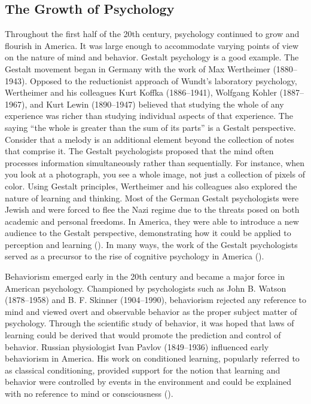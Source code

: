 \documentclass[
]{krantz}
\begin{document}
\subsection*{The Growth of Psychology}\label{the-growth-of-psychology}


Throughout the first half of the 20th century, psychology continued to grow and flourish in America. It was large enough to accommodate varying points of view on the nature of mind and behavior. Gestalt psychology is a good example. The Gestalt movement began in Germany with the work of Max Wertheimer (1880--1943). Opposed to the reductionist approach of Wundt's laboratory psychology, Wertheimer and his colleagues Kurt Koffka (1886--1941), Wolfgang Kohler (1887--1967), and Kurt Lewin (1890--1947) believed that studying the whole of any experience was richer than studying individual aspects of that experience. The saying ``the whole is greater than the sum of its parts'' is a Gestalt perspective. Consider that a melody is an additional element beyond the collection of notes that comprise it. The Gestalt psychologists proposed that the mind often processes information simultaneously rather than sequentially. For instance, when you look at a photograph, you see a whole image, not just a collection of pixels of color. Using Gestalt principles, Wertheimer and his colleagues also explored the nature of learning and thinking. Most of the German Gestalt psychologists were Jewish and were forced to flee the Nazi regime due to the threats posed on both academic and personal freedoms. In America, they were able to introduce a new audience to the Gestalt perspective, demonstrating how it could be applied to perception and learning (). In many ways, the work of the Gestalt psychologists served as a precursor to the rise of cognitive psychology in America ().

Behaviorism emerged early in the 20th century and became a major force in American psychology. Championed by psychologists such as John B. Watson (1878--1958) and B. F. Skinner (1904--1990), behaviorism rejected any reference to mind and viewed overt and observable behavior as the proper subject matter of psychology. Through the scientific study of behavior, it was hoped that laws of learning could be derived that would promote the prediction and control of behavior. Russian physiologist Ivan Pavlov (1849--1936) influenced early behaviorism in America. His work on conditioned learning, popularly referred to as classical conditioning, provided support for the notion that learning and behavior were controlled by events in the environment and could be explained with no reference to mind or consciousness ().
\end{document}
